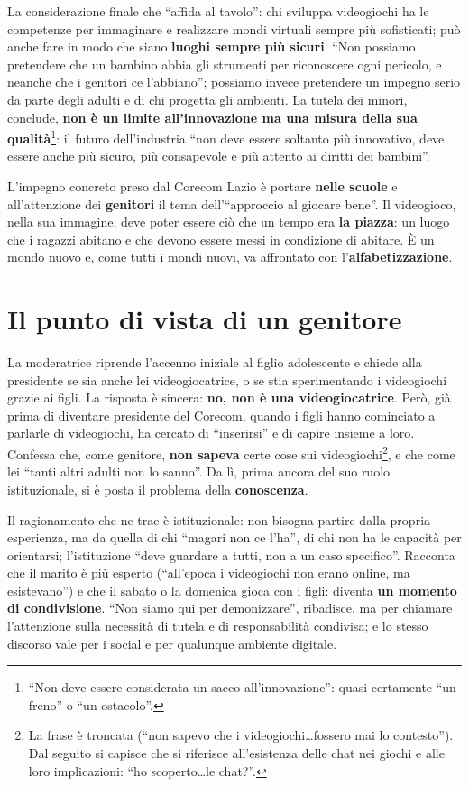 La considerazione finale che ``affida al tavolo'': chi sviluppa videogiochi ha
le competenze per immaginare e realizzare mondi virtuali sempre più sofisticati;
può anche fare in modo che siano \textbf{luoghi sempre più sicuri}. ``Non
possiamo pretendere che un bambino abbia gli strumenti per riconoscere ogni
pericolo, e neanche che i genitori ce l'abbiano''; possiamo invece pretendere un
impegno serio da parte degli adulti e di chi progetta gli ambienti. La tutela
dei minori, conclude, \textbf{non è un limite all'innovazione ma una misura
della sua qualità}\footnote{``Non deve essere considerata un sacco
all'innovazione'': quasi certamente ``un freno'' o ``un ostacolo''.}: il futuro
dell'industria ``non deve essere soltanto più innovativo, deve essere anche più
sicuro, più consapevole e più attento ai diritti dei bambini''.

L'impegno concreto preso dal Corecom Lazio è portare \textbf{nelle scuole} e
all'attenzione dei \textbf{genitori} il tema dell'``approccio al giocare bene''.
Il videogioco, nella sua immagine, deve poter essere ciò che un tempo era
\textbf{la piazza}: un luogo che i ragazzi abitano e che devono essere messi in
condizione di abitare. È un mondo nuovo e, come tutti i mondi nuovi, va
affrontato con l'\textbf{alfabetizzazione}.

\section{Il punto di vista di un genitore}
\label{sec:c1-1-genitore}

La moderatrice riprende l'accenno iniziale al figlio adolescente e chiede alla
presidente se sia anche lei videogiocatrice, o se stia sperimentando i
videogiochi grazie ai figli. La risposta è sincera: \textbf{no, non è una
videogiocatrice}. Però, già prima di diventare presidente del Corecom, quando i
figli hanno cominciato a parlarle di videogiochi, ha cercato di
``inserirsi'' e di capire insieme a loro. Confessa che, come genitore,
\textbf{non sapeva} certe cose sui videogiochi\footnote{La frase è troncata
(``non sapevo che i videogiochi\dots fossero mai lo contesto''). Dal seguito si
capisce che si riferisce all'esistenza delle chat nei giochi e alle loro
implicazioni: ``ho scoperto\dots le chat?''.}, e che come lei ``tanti altri adulti
non lo sanno''. Da lì, prima ancora del suo ruolo istituzionale, si è posta il
problema della \textbf{conoscenza}.

Il ragionamento che ne trae è istituzionale: non bisogna partire dalla propria
esperienza, ma da quella di chi ``magari non ce l'ha'', di chi non ha le
capacità per orientarsi; l'istituzione ``deve guardare a tutti, non a un caso
specifico''. Racconta che il marito è più esperto (``all'epoca i videogiochi non
erano online, ma esistevano'') e che il sabato o la domenica gioca con i figli:
diventa \textbf{un momento di condivisione}. ``Non siamo qui per demonizzare'',
ribadisce, ma per chiamare l'attenzione sulla necessità di tutela e di
responsabilità condivisa; e lo stesso discorso vale per i social e per
qualunque ambiente digitale.


